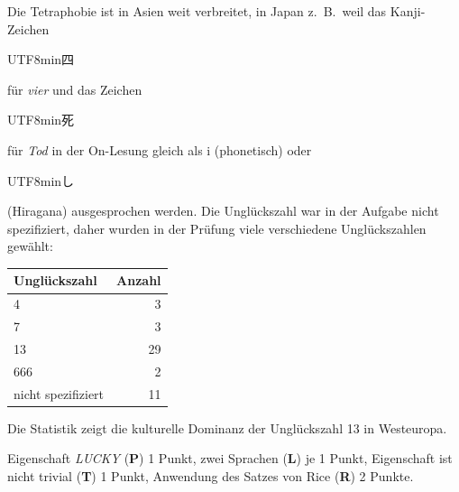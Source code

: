 \begin{diskussion}
Die Tetraphobie ist in Asien weit verbreitet, in Japan z.~B.~weil das
Kanji-Zeichen
\begin{CJK}{UTF8}{min}四\end{CJK}
für \textit{vier} und das Zeichen
\begin{CJK}{UTF8}{min}死\end{CJK}
für \textit{Tod}
in der On-Lesung gleich als
\textesh i (phonetisch) oder 
\begin{CJK}{UTF8}{min}し\end{CJK} (Hiragana) 
ausgesprochen werden.
Die Unglückszahl war in der Aufgabe nicht spezifiziert, daher wurden 
in der Prüfung viele verschiedene Unglückszahlen gewählt:
\begin{center}
\begin{tabular}{lr}
\hline
Unglückszahl       & Anzahl\raisebox{2pt}{\strut}\\
\hline
4                  &      3\raisebox{2pt}{\strut}\\
7                  &      3\\
13                 &     29\\
666                &      2\\
nicht spezifiziert &     11\\
\hline
\end{tabular}
\end{center}
Die Statistik zeigt die kulturelle Dominanz der Unglückszahl 13
in Westeuropa.
\end{diskussion}

\begin{bewertung}
Eigenschaft \textit{LUCKY} ({\bf P}) 1 Punkt,
zwei Sprachen ({\bf L}) je 1 Punkt,
Eigenschaft ist nicht trivial ({\bf T}) 1 Punkt,
Anwendung des Satzes von Rice ({\bf R}) 2 Punkte.
\end{bewertung}


